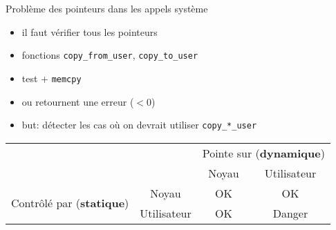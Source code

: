 
\begin{frame}{Problème des pointeurs dans les appels système}
\begin{itemize}
    \item il faut vérifier tous les pointeurs
    \item fonctions \texttt{copy\_from\_user}, \texttt{copy\_to\_user}
    \item test + \texttt{memcpy}
    \item ou retournent une erreur ($< 0$)
    \item but: détecter les cas où on devrait utiliser \texttt{copy\_*\_user}
\end{itemize}

\begin{center}
\begin{tabular}{cccc}
    \toprule
    & & \multicolumn{2}{p{2cm}}{Pointe sur \newline (\textbf{dynamique})} \\
    & & Noyau & Utilisateur \\
    \midrule
\multirow{2}{*}{\parbox{2cm}{Contrôlé par \newline (\textbf{statique})}}
    & Noyau  & OK & OK \\
    & Utilisateur & OK & Danger \\
    \bottomrule
\end{tabular}
\end{center}

\end{frame}
